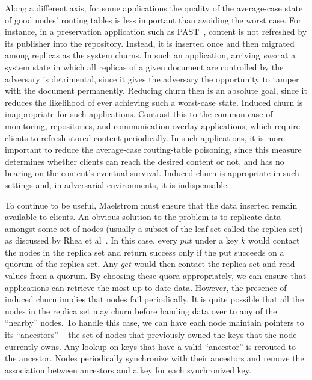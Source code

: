 \documentclass[10pt,twocolumn]{article}
\begin{document}
Along a different axis, for some applications the quality of the average-case state of
good nodes' routing tables is less important than avoiding the worst case.
For instance, in a preservation application such as
PAST~\cite{Rowstron2001b}, content is not refreshed by its publisher
into the repository. Instead, it is inserted once and then migrated
among replicas as the system churns.  In such an application, arriving \emph{ever}
at a system state in which all replicas of a given document
are controlled by the adversary is detrimental, since it gives the
adversary the opportunity to tamper with the document permanently.  Reducing
churn then is an absolute goal, since it reduces the likelihood of ever
achieving such a worst-case state.  Induced churn is inappropriate for
such applications.  Contrast this to the common case of monitoring,
repositories, and communication overlay applications, which require
clients to  refresh stored content periodically.  In
such applications, it is more important to reduce the average-case
routing-table poisoning, since this measure determines whether clients can reach the
desired content or not, and has no bearing on the content's eventual
survival.  Induced churn is appropriate in such settings and, in
adversarial environments, it is indispensable.

To continue to be useful, Maelstrom must ensure that the data inserted
remain available to clients. An obvious solution to the problem is
to replicate data amongst some set of nodes (usually a subset of the
leaf set called the replica set) as discussed by 
Rhea et al~\cite{Slowness-OpenDHT}. In this case, every $put$ under a key $k$
would contact the nodes in the replica set and return success only if
the put succeeds on a quorum of the replica set. Any $get$ would then
contact the replica set and read values from a quorum. By choosing these
quora appropriately, we can ensure that applications can retrieve the
most up-to-date data. However, the presence of induced churn implies
that nodes fail periodically. It is quite possible that all the nodes in
the replica set may churn before handing data over to any of the
``nearby'' nodes. To handle this case, we can have each node maintain
pointers to its ``ancestors'' -- the set of nodes that previously owned
the keys that the node currently owns. Any lookup on keys that have a
valid ``ancestor'' is rerouted to the ancestor. Nodes periodically
synchronize with their ancestors and remove the association between
ancestors and a key for each synchronized key.
\end{document}
